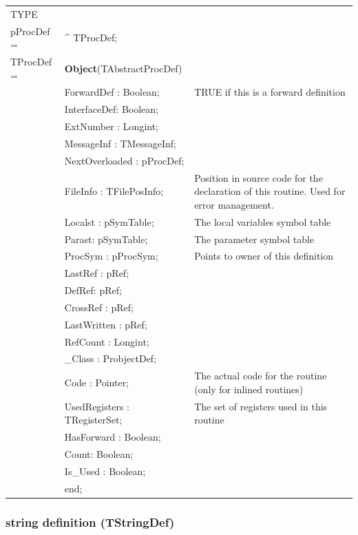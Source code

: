 \documentclass [a4paper,12pt]{article}
\begin{document}
\begin{tabular*}{6.5in}{|l@{\extracolsep{\fill}}lp{7.8cm}|}
\hline
\textsf{TYPE} & &  \\
\xspace pProcDef = & \^{}  TProcDef; & \\
\xspace \textsf{TProcDef} = & \textbf{Object}(TAbstractProcDef) & \\
&\textsf{ForwardDef : Boolean;}& TRUE if this is a forward definition \\
&\textsf{InterfaceDef: Boolean;}    &  \\
&\textsf{ExtNumber : Longint;}      &  \\
&\textsf{MessageInf : TMessageInf;} &  \\
&\textsf{NextOverloaded : pProcDef;}    &  \\
&\textsf{FileInfo : TFilePosInfo;}  &
    Position in source code for the declaration of this routine. Used
    for error management. \\
&\textsf{Localst : pSymTable;}      & The local variables symbol table \\
&\textsf{Parast: pSymTable;}& The parameter symbol table \\
&\textsf{ProcSym : pProcSym;}& Points to owner of this definition \\
&\textsf{LastRef : pRef;}&  \\
&\textsf{DefRef: pRef;}&  \\
&\textsf{CrossRef : pRef;}&  \\
&\textsf{LastWritten : pRef;}&  \\
&\textsf{RefCount : Longint;}&  \\
&\textsf{{\_}Class : ProbjectDef;}&  \\
&\textsf{Code : Pointer;}&
    The actual code for the routine (only for inlined routines) \\
&\textsf{UsedRegisters : TRegisterSet;}&
    The set of registers used in this routine \\
&\textsf{HasForward : Boolean;}&  \\
&\textsf{Count: Boolean;}&  \\
&\textsf{Is{\_}Used : Boolean;}&  \\
&\textsf{end;}&  \\
\hline
\end{tabular*}

\subsubsection{string definition (TStringDef)}
\label{subsubsec:string}
\end{document}
